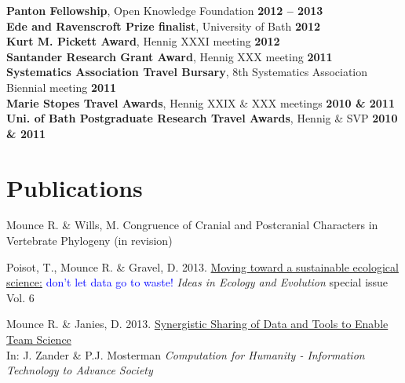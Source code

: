 \documentclass[margin,line]{resume}
\begin{document}
\begin{resume}
   \textbf{Panton Fellowship}, Open Knowledge Foundation \hfill \textbf{2012 -- 2013} \vspace{1mm}\\%
    \textbf{Ede and Ravenscroft Prize finalist}, University of Bath \hfill \textbf{2012}  \vspace{1mm}\\%
    \textbf{Kurt M. Pickett Award}, Hennig XXXI meeting \hfill \textbf{2012}  \vspace{1mm}\\%
    \textbf{Santander Research Grant Award}, Hennig XXX meeting \hfill \textbf{2011}      \vspace{1mm}\\%
    \textbf{Systematics Association Travel Bursary}, 8th Systematics Association Biennial meeting \hfill \textbf{2011} \vspace{1mm}\\%
    \textbf{Marie Stopes Travel Awards}, Hennig XXIX \& XXX meetings \hfill \textbf{2010 \& 2011}    \vspace{1mm}\\%
    \textbf{Uni. of Bath Postgraduate Research Travel Awards}, Hennig \& SVP \hfill \textbf{2010 \& 2011} \vspace{1mm}\\

\vspace{-7 mm}
    \section{\mysidestyle Publications}
    Mounce R. \& Wills, M. Congruence of Cranial and Postcranial Characters in Vertebrate Phylogeny (in revision)

\vspace{-2mm}
    Poisot, T., Mounce R. \& Gravel, D. 2013. \href{http://dx.doi.org/10.4033/iee.2013.6b.14.f}{Moving toward a sustainable ecological science:} 
\textcolor{blue}{don't let data go to waste!} \textsl{Ideas in Ecology and Evolution} {\color{red}special issue} Vol. 6

\vspace{-2mm}
    Mounce R. \& Janies, D. 2013. \href{http://www.academia.edu/1396044/Synergistic_sharing_of_data_and_tools_to_enable_team_science}{Synergistic Sharing of Data and Tools to Enable Team Science} \\ In: J. Zander \& P.J. Mosterman \textsl{Computation for Humanity - Information Technology to Advance Society}


\end{resume}
\end{document}
